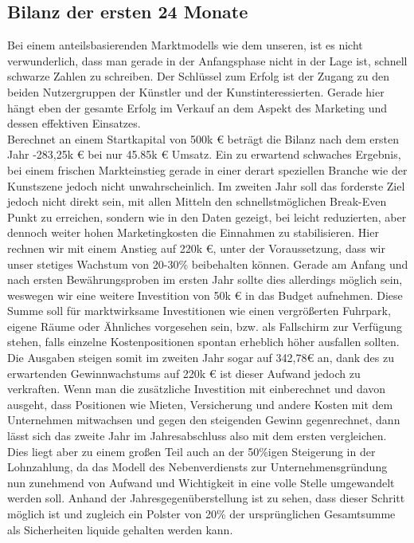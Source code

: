 \documentclass[11pt,a4paper]{report}
\begin{document}
\subsection{Bilanz der ersten 24 Monate}
Bei einem anteilsbasierenden Marktmodells wie dem unseren, ist es nicht verwunderlich, dass man gerade in der Anfangsphase nicht in der Lage ist, schnell schwarze Zahlen zu schreiben. Der Schlüssel zum Erfolg ist der Zugang zu den beiden Nutzergruppen der Künstler und der Kunstinteressierten. Gerade hier hängt eben der gesamte Erfolg im Verkauf an dem Aspekt des Marketing und dessen effektiven Einsatzes.\\
Berechnet an einem Startkapital von 500k € beträgt die Bilanz nach dem ersten Jahr -283,25k € bei nur 45.85k € Umsatz. Ein zu erwartend schwaches Ergebnis, bei einem frischen Markteinstieg gerade in einer derart speziellen Branche wie der Kunstszene jedoch nicht unwahrscheinlich. Im zweiten Jahr soll das forderste Ziel jedoch nicht direkt sein, mit allen Mitteln den schnellstmöglichen Break-Even Punkt zu erreichen, sondern wie in den Daten gezeigt, bei leicht reduzierten, aber dennoch weiter hohen Marketingkosten die Einnahmen zu stabilisieren. Hier rechnen wir mit einem Anstieg auf 220k €, unter der Voraussetzung, dass wir unser stetiges Wachstum von 20-30\% beibehalten können. Gerade am Anfang und nach ersten Bewährungsproben im ersten Jahr sollte dies allerdings möglich sein, weswegen wir eine weitere Investition von 50k € in das Budget aufnehmen. Diese Summe soll für marktwirksame Investitionen wie einen vergrößerten Fuhrpark, eigene Räume oder Ähnliches vorgesehen sein, bzw. als Fallschirm zur Verfügung stehen, falls einzelne Kostenpositionen spontan erheblich höher ausfallen sollten.\\
Die Ausgaben steigen somit im zweiten Jahr sogar auf 342,78€ an, dank des zu erwartenden Gewinnwachstums auf 220k € ist dieser Aufwand jedoch zu verkraften. Wenn man die zusätzliche Investition mit einberechnet und davon ausgeht, dass Positionen wie Mieten, Versicherung und andere Kosten mit dem Unternehmen mitwachsen und gegen den steigenden Gewinn gegenrechnet, dann lässt sich das zweite Jahr im Jahresabschluss also mit dem ersten vergleichen. Dies liegt aber zu einem großen Teil auch an der 50\%igen Steigerung in der Lohnzahlung, da das Modell des Nebenverdiensts zur Unternehmensgründung nun zunehmend von Aufwand und Wichtigkeit in eine volle Stelle umgewandelt werden soll. Anhand der Jahresgegenüberstellung ist zu sehen, dass dieser Schritt möglich ist und zugleich ein Polster von 20\% der ursprünglichen Gesamtsumme als Sicherheiten liquide gehalten werden kann.
\end{document}
